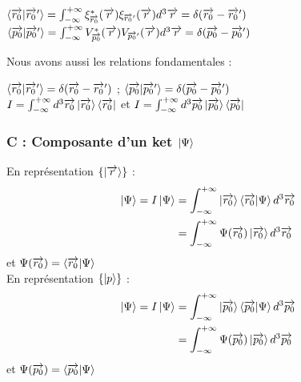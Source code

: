 \documentclass[12pt,a4paper,titlepage]{book}
\begin{document}
\begin{center}
$\braket{\overrightarrow{r_0} \vert \overrightarrow{r_0}'} = \int_{- \infty}^{+ \infty} \xi_{\overrightarrow{r_0}}^{*} (\overrightarrow{r}) \xi_{\overrightarrow{r_0}'} (\overrightarrow{r}) d^3 \overrightarrow{r} = \delta (\overrightarrow{r_0} - \overrightarrow{r_0}')$\\
$\braket{\overrightarrow{p_0} \vert \overrightarrow{p_0}'} = \int_{- \infty}^{+ \infty} V_{\overrightarrow{p_0}}^{*} (\overrightarrow{r}) V_{\overrightarrow{p_0}'} (\overrightarrow{r}) d^3 \overrightarrow{r} = \delta (\overrightarrow{p_0} - \overrightarrow{p_0}')$
\end{center}
Nous avons aussi les relations fondamentales :
\begin{center}
$\braket{\overrightarrow{r_0} \vert \overrightarrow{r_0}'} = \delta (\overrightarrow{r_0} - \overrightarrow{r_0}')$ ; $\braket{\overrightarrow{p_0} \vert \overrightarrow{p_0}'} = \delta (\overrightarrow{p_0} - \overrightarrow{p_0}')$\\
$I = \int_{- \infty}^{+ \infty} d^3 \overrightarrow{r_0} \ket{\overrightarrow{r_0}} \bra{\overrightarrow{r_0}}$ et $I = \int_{- \infty}^{+ \infty} d^3 \overrightarrow{p_0} \ket{\overrightarrow{p_0}} \bra{\overrightarrow{p_0}}$
\end{center}

\subsubsection{C : Composante d'un ket $\ket{\Psi}$}

En représentation $\lbrace \ket{\overrightarrow{r}} \rbrace$ :
\begin{align*}
\ket\Psi = I \ket\Psi &= \int_{- \infty}^{+ \infty} \ket{\overrightarrow{r_0}} \braket{\overrightarrow{r_0} \vert \Psi} d^3 \overrightarrow{r_0}\\
&= \int_{- \infty}^{+ \infty} \Psi (\overrightarrow{r_0}) \ket{\overrightarrow{r_0}} d^3 \overrightarrow{r_0}
\end{align*}
et $\Psi (\overrightarrow{r_0}) = \braket{\overrightarrow{r_0} \vert \Psi}$\\

En représentation $\lbrace \ket{p} \rbrace$ :
\begin{align*}
\ket\Psi = I \ket\Psi &= \int_{- \infty}^{+ \infty} \ket{\overrightarrow{p_0}} \braket{\overrightarrow{p_0} \vert \Psi} d^3 \overrightarrow{p_0}\\
&= \int_{- \infty}^{+ \infty} \Psi (\overrightarrow{p_0}) \ket{\overrightarrow{p_0}} d^3 \overrightarrow{p_0}
\end{align*}
et $\Psi (\overrightarrow{p_0}) = \braket{\overrightarrow{p_0} \vert \Psi}$\\
\end{document}
